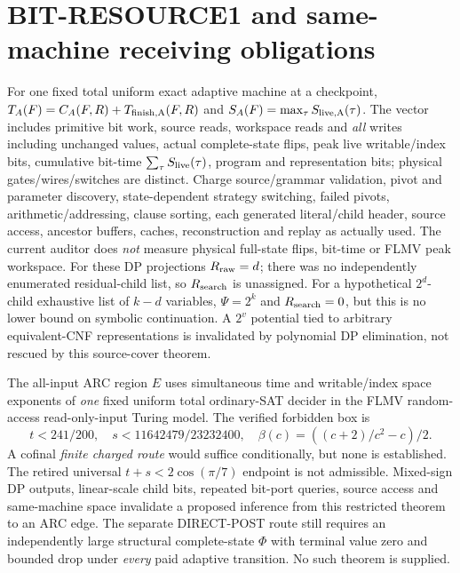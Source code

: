 \documentclass[11pt]{article}
\begin{document}
\section{BIT-RESOURCE1 and same-machine receiving obligations}
For one fixed total uniform exact adaptive machine at a checkpoint,
$T_A(F)=C_A(F,R)+T_{\rm finish,A}(F,R)$ and
$S_A(F)=\max_\tau S_{\rm live,A}(\tau)$.
The vector includes primitive bit work, source reads,
workspace reads and \emph{all} writes including unchanged values,
actual complete-state flips, peak live writable/index bits,
cumulative bit-time $\sum_\tau S_{\rm live}(\tau)$,
program and representation bits; physical gates/wires/switches
are distinct. Charge source/grammar validation,
pivot and parameter discovery, state-dependent strategy switching,
failed pivots, arithmetic/addressing, clause sorting,
each generated literal/child header, source access, ancestor
buffers, caches, reconstruction and replay as actually used.
The current auditor does \emph{not} measure physical full-state
flips, bit-time or FLMV peak workspace. For these DP
projections $R_{\rm raw}=d$; there was no independently
enumerated residual-child list, so $R_{\rm search}$ is unassigned.
For a hypothetical $2^d$-child exhaustive list of $k-d$
variables, $\Psi=2^k$ and $R_{\rm search}=0$,
but this is no lower bound on symbolic continuation.
A $2^{v}$ potential tied to arbitrary equivalent-CNF
representations is invalidated by polynomial DP elimination,
not rescued by this source-cover theorem.

The all-input ARC region $E$ uses simultaneous time and
writable/index space exponents of \emph{one} fixed uniform
total ordinary-SAT decider in the FLMV random-access
read-only-input Turing model. The verified forbidden box is
\[
t<241/200,\quad s<11642479/23232400,\quad
\beta(c)=((c+2)/c^2-c)/2.
\]
A cofinal \emph{finite charged route} would suffice conditionally,
but none is established. The retired universal
$t+s<2\cos(\pi/7)$ endpoint is not admissible.
Mixed-sign DP outputs, linear-scale child bits,
repeated bit-port queries, source access and
same-machine space invalidate a proposed inference
from this restricted theorem to an ARC edge.
The separate DIRECT-POST route still requires an independently
large structural complete-state $\Phi$ with terminal value zero
and bounded drop under \emph{every} paid adaptive transition.
No such theorem is supplied.
\end{document}
